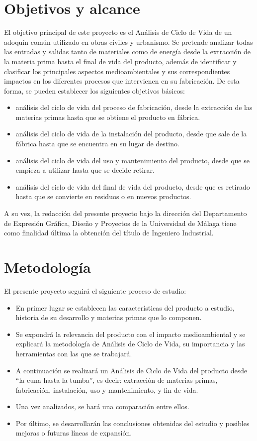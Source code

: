 \section{Objetivos y alcance}
El objetivo principal de este proyecto es el Análisis de Ciclo de Vida de un adoquín común utilizado en obras civiles y urbanismo. Se pretende analizar todas las entradas y salidas tanto de materiales como de energía desde la extracción de la materia prima hasta el final de vida del producto, además de identificar y clasificar los principales aspectos medioambientales y sus correspondientes impactos en los diferentes procesos que intervienen en su fabricación. De esta forma, se pueden establecer los siguientes objetivos básicos:
\begin{itemize}
\item análisis del ciclo de vida del proceso de fabricación, desde la extracción de las materias primas hasta que se obtiene el producto en fábrica.
\item análisis del ciclo de vida de la instalación del producto, desde que sale de la fábrica hasta que se encuentra en su lugar de destino.
\item análisis del ciclo de vida del uso y mantenimiento del producto, desde que se empieza a utilizar hasta que se decide retirar.
\item análisis del ciclo de vida del final de vida del producto, desde que es retirado hasta que se convierte en residuos o en nuevos productos.
\end{itemize}

A su vez, la redacción del presente proyecto bajo la dirección del Departamento de Expresión Gráfica, Diseño y Proyectos de la Universidad de Málaga tiene como finalidad última la obtención del título de Ingeniero Industrial.

\section{Metodología}

El presente proyecto seguirá el siguiente proceso de estudio:

\begin{itemize}
  \item En primer lugar se establecen las características del producto a estudio, historia de su desarrollo y materias primas que lo componen.
  \item Se expondrá la relevancia del producto con el impacto medioambiental y se explicará la metodología de Análisis de Ciclo de Vida, su importancia y las herramientas con las que se trabajará.
  \item A continuación se realizará un Análisis de Ciclo de Vida del producto desde ``la cuna hasta la tumba'', es decir: extracción de materias primas, fabricación, instalación, uso y mantenimiento, y fin de vida.
  \item Una vez analizados, se hará una comparación entre ellos.
  \item Por último, se desarrollarán las conclusiones obtenidas del estudio y posibles mejoras o futuras líneas de expansión.
\end{itemize}

